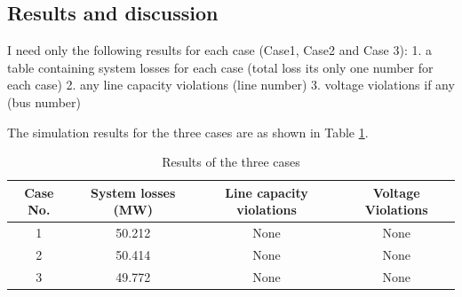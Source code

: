 \subsection{Results and discussion}
I need only the following results for each case (Case1, Case2 and Case 3):
1. a table containing system losses for each case (total loss its only one number for each case)
2. any line capacity violations (line number)
3. voltage violations if any (bus number)

The simulation results for the three cases are as shown in Table \ref{tab:results3cases}.

\begin{table}[ht]
\begin{center}
\caption{Results of the three cases}
\begin{tabular}{|c|c|c|c|}
\hline
Case No. & System losses (MW) & Line capacity violations & Voltage Violations \\
\hline
1 & 50.212 & None & None\\
2 & 50.414 & None & None \\
3 & 49.772 & None & None  \\

\hline

\end{tabular}
   \vspace{.05in}
\label{tab:results3cases}
\end{center}
\end{table} 